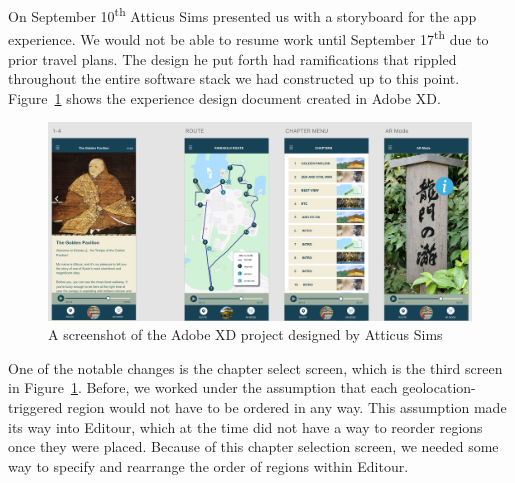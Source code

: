 \documentclass[a4paper, 10pt, american, titlepage]{article}
\begin{document}
On September 10\textsuperscript{th} Atticus Sims presented us with a storyboard
for the app experience. We would not be able to resume work until September
17\textsuperscript{th} due to prior travel plans. The design he put forth had
ramifications that rippled throughout the entire software stack we had
constructed up to this point. Figure~\ref{fig:adobeXdDesign} shows the
experience design document created in Adobe XD.

\begin{figure}[h]
	\centering
	\includegraphics[width=1\textwidth]{adobe-xd-design.png}
	\caption[A screenshot of the Adobe XD project designed by Atticus Sims]
    {A screenshot of the Adobe XD project designed by Atticus Sims}
	\label{fig:adobeXdDesign}
\end{figure}

One of the notable changes is the chapter select screen, which is the third
screen in Figure~\ref{fig:adobeXdDesign}. Before, we worked under the assumption
that each geolocation-triggered region would not have to be ordered in any way.
This assumption made its way into Editour, which at the time did not have a way
to reorder regions once they were placed. Because of this chapter selection
screen, we needed some way to specify and rearrange the order of regions within
Editour.
\end{document}
